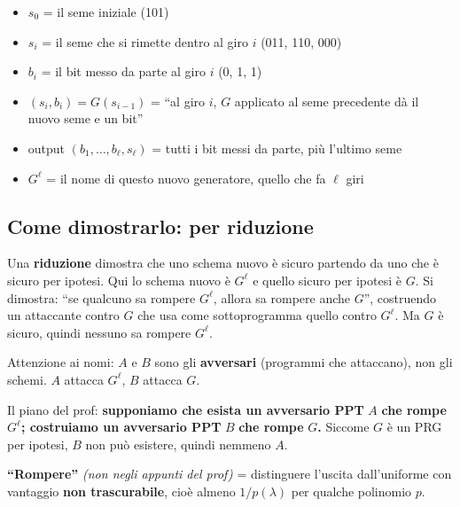\begin{itemize}
\tightlist
\item
  \(s_0\) = il seme iniziale (101)
\item
  \(s_i\) = il seme che si rimette dentro al giro \(i\) (011, 110, 000)
\item
  \(b_i\) = il bit messo da parte al giro \(i\) (0, 1, 1)
\item
  \((s_i, b_i) = G(s_{i-1})\) = ``al giro \(i\), \(G\) applicato al seme precedente dà il nuovo seme e un bit''
\item
  output \((b_1, \dots, b_\ell, s_\ell)\) = tutti i bit messi da parte, più l'ultimo seme
\item
  \(G^\ell\) = il nome di questo nuovo generatore, quello che fa \(\ell\) giri
\end{itemize}

\subsection{Come dimostrarlo: per riduzione}

\begin{inbreve}

Una \textbf{riduzione} dimostra che uno schema nuovo è sicuro partendo da uno che è sicuro per ipotesi. Qui lo schema nuovo è \(G^\ell\) e quello sicuro per ipotesi è \(G\). Si dimostra: ``se qualcuno sa rompere \(G^\ell\), allora sa rompere anche \(G\)'', costruendo un attaccante contro \(G\) che usa come sottoprogramma quello contro \(G^\ell\). Ma \(G\) è sicuro, quindi nessuno sa rompere \(G^\ell\).

Attenzione ai nomi: \(A\) e \(B\) sono gli \textbf{avversari} (programmi che attaccano), non gli schemi. \(A\) attacca \(G^\ell\), \(B\) attacca \(G\).

\end{inbreve}

Il piano del prof: \textbf{supponiamo che esista un avversario PPT} \(A\) \textbf{che rompe} \(G^\ell\)\textbf{; costruiamo un avversario PPT} \(B\) \textbf{che rompe} \(G\)\textbf{.} Siccome \(G\) è un PRG per ipotesi, \(B\) non può esistere, quindi nemmeno \(A\).

\begin{nota}

\textbf{``Rompere''} \emph{(non negli appunti del prof)} = distinguere l'uscita dall'uniforme con vantaggio \textbf{non trascurabile}, cioè almeno \(1/p(\lambda)\) per qualche polinomio \(p\).

\end{nota}

